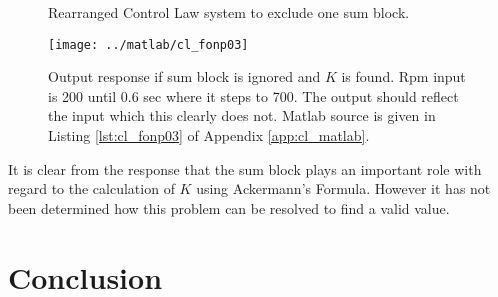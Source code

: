 \documentclass{article}
\begin{document}
\begin{figure}[hpb!]
\begin{center}


\end{center}

\caption{Rearranged Control Law system to exclude one sum block.}
\label{fig:clffnp03}
\end{figure}

\begin{figure}[htbp!]
\begin{center}
\texttt{[image: ../matlab/cl\_fonp03]}
\end{center}
\caption{Output response if sum block is ignored and $K$ is found.
Rpm input is 200 until 0.6 sec where it steps to 700.
The output should reflect the input which this clearly does not.
Matlab source is given in Listing \ref{lst:cl_fonp03}
of Appendix \ref{app:cl_matlab}.
}
\label{fig:cl_fonp03}
\end{figure}

It is clear from the response that the sum block plays an important
role with regard to the calculation of $K$ using Ackermann's Formula.
However it has not been determined how this problem can be
resolved to find a valid value.


\clearpage
\section{Conclusion}
\end{document}
